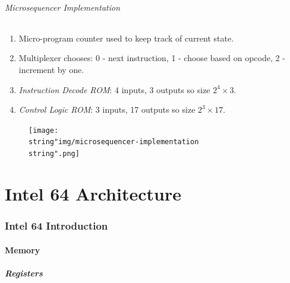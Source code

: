 \documentclass[twocolumn,english]{article}
\begin{document}
\paragraph{Microsequencer Implementation}
\begin{enumerate}
\item Micro-program counter used to keep track of current state.
\item Multiplexer chooses: 0 - next instruction, 1 - choose based on opcode,
2 - increment by one.
\item \emph{Instruction Decode ROM}: 4 inputs, 3 outputs so size $2^{4}\times3$.
\item \emph{Control Logic ROM}: 3 inputs, 17 outputs so size $2^{3}\times17$.
\end{enumerate}
\begin{figure}[H]
\noindent \centering{}\texttt{[image: \\string"img/microsequencer-implementation\\string".png]}
\end{figure}



\part{Intel 64 Architecture}


\section{Intel 64 Introduction}


\subsection{Memory}


\subsubsection{Registers}
\end{document}
